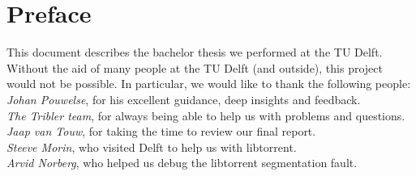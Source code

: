 \chapter*{Preface}
This document describes the bachelor thesis we performed at the TU Delft. Without the aid of many people at the TU Delft (and outside), this project would not be possible. In particular, we would like to thank the following people: \\

\emph{Johan Pouwelse}, for his excellent guidance, deep insights and feedback.\\

\emph{The Tribler team}, for always being able to help us with problems and questions.\\

\emph{Jaap van Touw}, for taking the time to review our final report.\\

\emph{Steeve Morin}, who visited Delft to help us with libtorrent.\\

\emph{Arvid Norberg}, who helped us debug the libtorrent segmentation fault.